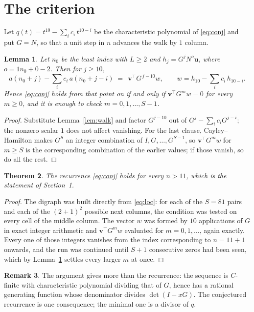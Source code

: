 \documentclass[11pt,a4paper]{article}
\theoremstyle{plain}
\newtheorem{theorem}{Theorem}
\newtheorem{lemma}[theorem]{Lemma}
\theoremstyle{definition}
\newtheorem{remark}[theorem]{Remark}
\begin{document}
\section{The criterion}

Let $q(t)=t^{10}-\sum_i c_i\,t^{10-i}$ be the characteristic polynomial of
\eqref{eq:conj} and put $G=N$, so that a unit step in $n$ advances the walk by
$1$ column.

\begin{lemma}\label{lem:crit}
Let $n_0$ be the least index with $L\ge2$ and $h_j=G^{j}N^{o}\mathbf{u}$, where
$o=1n_0+0-2$. Then for $j\ge10$,
\[
a(n_0+j)-\sum_i c_i\,a(n_0+j-i)\;=\;\,\mathbf{v}^{\!\top}G^{\,j-10}w,
\qquad w=h_{10}-\sum_i c_i\,h_{10-i} .
\]
Hence \eqref{eq:conj} holds from that point on if and only if
$\mathbf{v}^{\!\top}G^{m}w=0$ for every $m\ge0$, and it is enough to check
$m=0,1,\dots,S-1$.
\end{lemma}

\begin{proof}
Substitute Lemma~\ref{lem:walk} and factor $G^{j-10}$ out of
$G^{j}-\sum_ic_iG^{j-i}$; the nonzero scalar $1$ does not affect
vanishing. For the last clause, Cayley--Hamilton makes $G^{S}$ an integer combination of
$I,G,\dots,G^{S-1}$, so $\mathbf{v}^{\!\top}G^{m}w$ for $m\ge S$ is the corresponding
combination of the earlier values; if those vanish, so do all the rest.
\end{proof}

\begin{theorem}
The recurrence \eqref{eq:conj} holds for every $n>11$, which is the statement of
Section~1.
\end{theorem}

\begin{proof}
The digraph was built directly from \eqref{eq:loc}: for each of the $S=81$ pairs and each
of the $(2+1)^{2}$ possible next columns, the condition was tested on every cell of
the middle column. The vector $w$ was formed by $10$ applications of $G$ in exact integer
arithmetic and $\mathbf{v}^{\!\top}G^{m}w$ evaluated for $m=0,1,\dots$, again exactly.
Every one of those integers vanishes from the index corresponding to $n=11+1$ onwards,
and the run was continued until $S+1$ consecutive zeros had been seen, which by
Lemma~\ref{lem:crit} settles every larger $m$ at once.
\end{proof}

\begin{remark}
The argument gives more than the recurrence: the sequence is $C$-finite with characteristic
polynomial dividing that of $G$, hence has a rational generating function whose denominator
divides $\det(I-xG)$. The conjectured recurrence is one consequence; the minimal one is a
divisor of $q$.
\end{remark}
\end{document}
